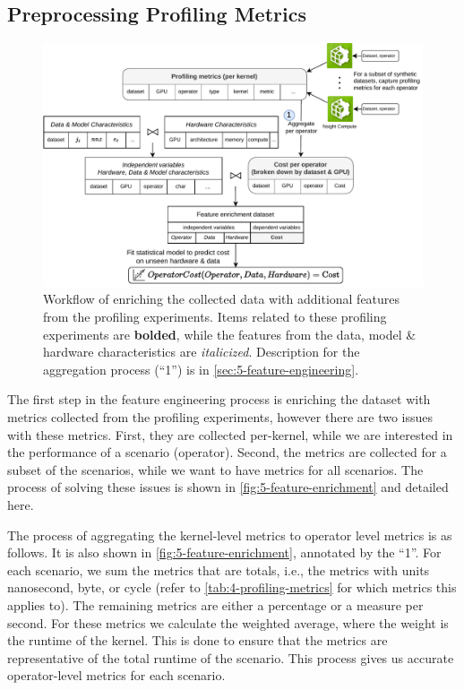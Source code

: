 \subsection{Preprocessing Profiling Metrics}
\begin{figure}[ht]
    \centering
    \includegraphics[width=\linewidth]{chapters/05_cost_estimation/figures/feature-engineering.pdf}
    \caption[Feature enrichment workflow]{Workflow of enriching the collected data with additional features from the profiling experiments. Items related to these profiling experiments are \textbf{bolded}, while the features from the data, model \& hardware characteristics are \textit{italicized}. Description for the aggregation process (“1”) is in \autoref{sec:5-feature-engineering}.}
    \label{fig:5-feature-enrichment}
\end{figure}

The first step in the feature engineering process is enriching the dataset with metrics collected from the profiling experiments, however there are two issues with these metrics. First, they are collected per-kernel, while we are interested in the performance of a scenario (operator). Second, the metrics are collected for a subset of the scenarios, while we want to have metrics for all scenarios. The process of solving these issues is shown in \autoref{fig:5-feature-enrichment} and detailed here.

The process of aggregating the kernel-level metrics to operator level metrics is as follows. It is also shown in \autoref{fig:5-feature-enrichment}, annotated by the “1”. For each scenario, we sum the metrics that are totals, i.e., the metrics with units nanosecond, byte, or cycle (refer to \autoref{tab:4-profiling-metrics} for which metrics this applies to). The remaining metrics are either a percentage or a measure per second. For these metrics we calculate the weighted average, where the weight is the runtime of the kernel. This is done to ensure that the metrics are representative of the total runtime of the scenario. This process gives us accurate operator-level metrics for each scenario.

